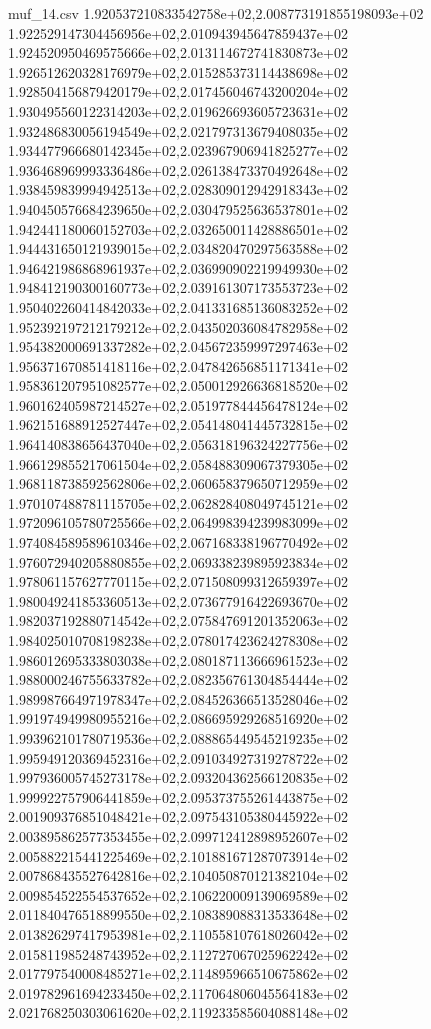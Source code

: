 \begin{filecontents*}{muf_14.csv}
1.920537210833542758e+02,2.008773191855198093e+02
1.922529147304456956e+02,2.010943945647859437e+02
1.924520950469575666e+02,2.013114672741830873e+02
1.926512620328176979e+02,2.015285373114438698e+02
1.928504156879420179e+02,2.017456046743200204e+02
1.930495560122314203e+02,2.019626693605723631e+02
1.932486830056194549e+02,2.021797313679408035e+02
1.934477966680142345e+02,2.023967906941825277e+02
1.936468969993336486e+02,2.026138473370492648e+02
1.938459839994942513e+02,2.028309012942918343e+02
1.940450576684239650e+02,2.030479525636537801e+02
1.942441180060152703e+02,2.032650011428886501e+02
1.944431650121939015e+02,2.034820470297563588e+02
1.946421986868961937e+02,2.036990902219949930e+02
1.948412190300160773e+02,2.039161307173553723e+02
1.950402260414842033e+02,2.041331685136083252e+02
1.952392197212179212e+02,2.043502036084782958e+02
1.954382000691337282e+02,2.045672359997297463e+02
1.956371670851418116e+02,2.047842656851171341e+02
1.958361207951082577e+02,2.050012926636818520e+02
1.960162405987214527e+02,2.051977844456478124e+02
1.962151688912527447e+02,2.054148041445732815e+02
1.964140838656437040e+02,2.056318196324227756e+02
1.966129855217061504e+02,2.058488309067379305e+02
1.968118738592562806e+02,2.060658379650712959e+02
1.970107488781115705e+02,2.062828408049745121e+02
1.972096105780725566e+02,2.064998394239983099e+02
1.974084589589610346e+02,2.067168338196770492e+02
1.976072940205880855e+02,2.069338239895923834e+02
1.978061157627770115e+02,2.071508099312659397e+02
1.980049241853360513e+02,2.073677916422693670e+02
1.982037192880714542e+02,2.075847691201352063e+02
1.984025010708198238e+02,2.078017423624278308e+02
1.986012695333803038e+02,2.080187113666961523e+02
1.988000246755633782e+02,2.082356761304854444e+02
1.989987664971978347e+02,2.084526366513528046e+02
1.991974949980955216e+02,2.086695929268516920e+02
1.993962101780719536e+02,2.088865449545219235e+02
1.995949120369452316e+02,2.091034927319278722e+02
1.997936005745273178e+02,2.093204362566120835e+02
1.999922757906441859e+02,2.095373755261443875e+02
2.001909376851048421e+02,2.097543105380445922e+02
2.003895862577353455e+02,2.099712412898952607e+02
2.005882215441225469e+02,2.101881671287073914e+02
2.007868435527642816e+02,2.104050870121382104e+02
2.009854522554537652e+02,2.106220009139069589e+02
2.011840476518899550e+02,2.108389088313533648e+02
2.013826297417953981e+02,2.110558107618026042e+02
2.015811985248743952e+02,2.112727067025962242e+02
2.017797540008485271e+02,2.114895966510675862e+02
2.019782961694233450e+02,2.117064806045564183e+02
2.021768250303061620e+02,2.119233585604088148e+02

\end{filecontents*}
